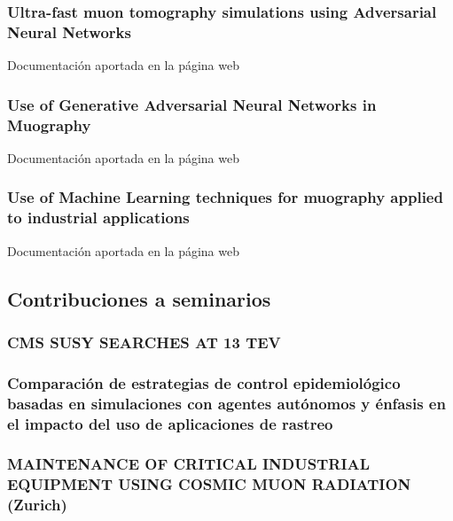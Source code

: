 \documentclass[a4paper, 11pt, twoside, openright]{report}
\begin{document}
\subsubsection{Ultra-fast muon tomography simulations using Adversarial Neural Networks}
%
Documentación aportada en la página web

\subsubsection{Use of Generative Adversarial Neural Networks in Muography}
%
Documentación aportada en la página web

\subsubsection{Use of Machine Learning techniques for muography applied to industrial applications}
%
Documentación aportada en la página web


\subsection{Contribuciones a seminarios}

\subsubsection{CMS SUSY SEARCHES AT 13 TEV}


\subsubsection{Comparación de estrategias de control epidemiológico basadas en simulaciones con agentes autónomos y énfasis en el impacto del uso de aplicaciones de rastreo}


\subsubsection{MAINTENANCE OF CRITICAL INDUSTRIAL EQUIPMENT USING COSMIC MUON RADIATION (Zurich)}

\end{document}
